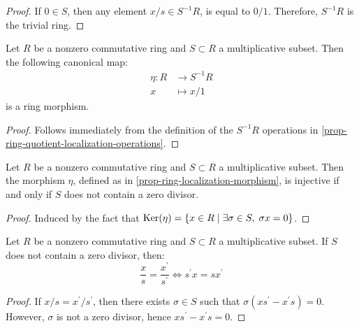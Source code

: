 \documentclass[12pt]{report}
\begin{document}
\begin{proof}
    If $0 \in S$, then any element $x / s \in S^{-1} R$, is equal to $0 / 1$. Therefore, $S^{-1} R$ is the trivial ring.
\end{proof}

\begin{proposition} \label{prop-ring-localization-morphism}
    Let $R$ be a nonzero commutative ring and $S \subset R$ a multiplicative subset. Then the following canonical map: 
    \[
        \begin{aligned}
            \eta \colon R &\longrightarrow S^{-1} R \\
            x &\longmapsto x / 1
        \end{aligned}
    \]
    is a ring morphism.
\end{proposition}

\begin{proof}
    Follows immediately from the definition of the $S^{-1} R$ operations in \ref{prop-ring-quotient-localization-operations}.
\end{proof}

\begin{proposition} \label{prop-ring-localization-morphism-injectivity}
    Let $R$ be a nonzero commutative ring and $S \subset R$ a multiplicative subset. Then the morphism $\eta$, defined as in \ref{prop-ring-localization-morphism}, is injective if and only if $S$ does not contain a zero divisor.
\end{proposition}

\begin{proof}
    Induced by the fact that $\operatorname{Ker} (\eta) = \lbrace x \in R \mid \exists \sigma \in S, \; \sigma x = 0 \rbrace$.
\end{proof}

\begin{proposition} \label{prop-ring-localization-eq-condition}
    Let $R$ be a nonzero commutative ring and $S \subset R$ a multiplicative subset. If $S$ does not contain a zero divisor, then:
    \[
        \frac{x}{s} = \frac{x^{\prime}}{s^{\prime}} \iff s^{\prime} x = s x^{\prime}
    \]
\end{proposition}

\begin{proof}
    If $x / s = x^{\prime} / s^{\prime}$, then there exists $\sigma \in S$ such that $\sigma (x s^{\prime} - x^{\prime} s) = 0$. However, $\sigma$ is not a zero divisor, hence $x s^{\prime} - x^{\prime} s = 0$. 
\end{proof}
\end{document}
